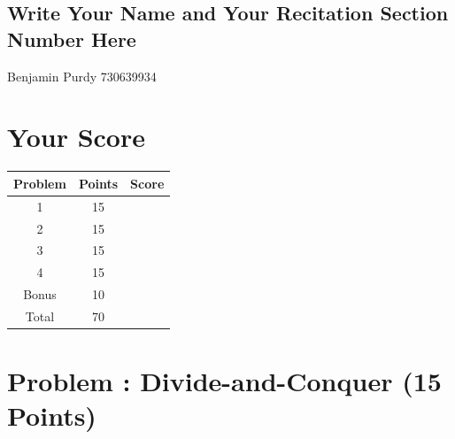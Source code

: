 \documentclass[12pt]{amsart}
\newcounter{pNum}
\newcommand{\problem}[2]{\addtocounter{pNum}{1}
\section*{Problem \arabic{pNum}: #1 (#2 Points)}}
\begin{document}
\vfill


\begin{framed}
\vspace{-0.3cm}
\section*{Write Your Name and Your Recitation Section Number Here}

Benjamin Purdy 730639934

\begin{center}{\hspace{2cm}} \end{center}
\vspace{1cm}
\end{framed}
\vfill

\newpage

\vfill

\hspace{0cm}

\vfill

\section*{Your Score}

\vfill

\begin{center}
\begin{tabular}{|c|c|c|}
\hline
Problem &
Points &
Score \\ \hline
1 & 15 & \\ \hline
2 & 15 & \\ \hline
3 & 15 & \\ \hline
4 & 15 & \\ \hline
Bonus & 10 & \\ \hline
Total & 70 & \\
\hline
\end{tabular}
\end{center}

\vfill

\hspace{0cm}

\vfill

\newpage

\newpage

\problem{Divide-and-Conquer}{15}
\end{document}

